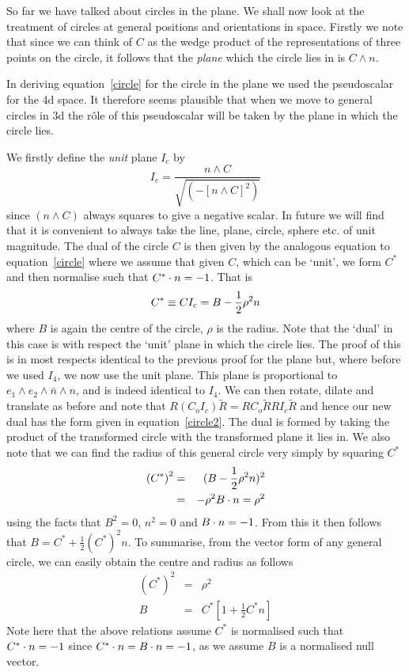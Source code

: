 So far we have talked about circles in the plane. We shall
now look at the treatment of circles at general positions and orientations
in space. Firstly we note that since we can think of $C$
as the wedge product of the representations of three
points on the circle, it follows that the \emph{plane}
which the circle lies in is $C \wedge n$.

In deriving equation~\ref{circle} for the circle in the plane we
used the pseudoscalar for the 4d space. It therefore seems plausible that
when we move to general circles in 3d the r\^ole of this
pseudoscalar will be taken by the plane in which the circle lies.

We firstly define the \emph{unit} plane $I_c$ by
%
\begin{equation}
  I_c = \frac{n\wedge C}{\sqrt{(-[n\wedge C]^2)}}
\end{equation}
%
since $(n\wedge C)$ always squares to give a negative
scalar. In future we will find
that it is convenient to always take the line, plane, circle,
sphere etc. of unit magnitude.
The dual of the circle $C$ is then given by the
analogous equation to equation~\ref{circle} where we
assume that given $C$, which can be `unit', we form $C^*$
and then normalise such that $C^*\cdot n= -1$. That is
%
\begin{equation}
   C^* \equiv C I_c= B - \frac{1}{2}\rho^2 n
   \label{circle2}
   \end{equation}
%
where $B$ is again the centre of the circle, $\rho$ is the radius.
Note that the `dual' in this case is with respect the `unit' plane
in which the circle lies. The proof of this is in most respects
identical to the previous proof for the plane but, where before we
used $I_4$, we now use the unit plane. This plane is proportional to
$e_1\wedge e_2\wedge \bar{n}\wedge n$, and is indeed identical to $I_4$.
We can then rotate, dilate and translate as before and note that
$R(C_o I_c)\tilde{R}=RC_o\tilde{R}RI_c\tilde{R}$ and hence our new
dual has the form given in equation~\ref{circle2}. The dual is formed by
taking the product of the transformed circle with the transformed
plane it lies in.  We also note that we can find the radius of
this general circle very simply by squaring $C^*$
%
\begin{eqnarray}
\left(C^*\right)^2 &  = &  (B - \frac{1}{2}\rho^2n)^2 \nonumber \\
                  & = &  -\rho^2B\cdot n = \rho^2
\end{eqnarray}
%
using the facts that $B^2=0$, $n^2=0$ and $B\cdot n = -1$. From this
it then follows that $B = C^* + \frac{1}{2}(C^*)^2n$. To
summarise, from the vector form of any general circle, we can
easily obtain the centre and radius as follows
%
\begin{eqnarray}
    \left(C^*\right)^2 &  = &      \rho^2 \\
    B & = &  C^* \left[ 1 + \frac{1}{2}C^*n \right]
 \end{eqnarray}
Note here that the above relations assume $C^*$  is normalised
such that $C^*\cdot n=-1$ since $C^*\cdot n = B\cdot n = -1$, as we
assume $B$ is a normalised null vector.

